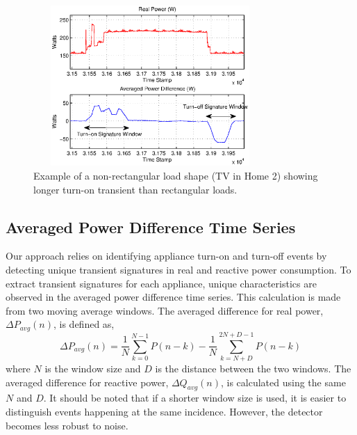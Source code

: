 \documentclass[conference]{IEEEtran}
\begin{document}
\begin{figure}[!t]
	\centering
	\includegraphics[height = 2.4in,width=3.5in]{fig/nonrec.eps}
	\caption{Example of a non-rectangular load shape (TV in Home 2) showing longer turn-on transient than rectangular loads.}
	\label{fig:nonrec}
\end{figure}


\subsection{Averaged Power Difference Time Series}
Our approach relies on identifying appliance turn-on and turn-off events by detecting unique transient signatures in real and reactive power consumption. To extract transient signatures for each appliance, unique characteristics are observed in the averaged power difference time series. This calculation is made from two moving average windows.  The averaged difference for real power, $\Delta P_{avg}(n)$, is defined as,
\begin{equation}
\Delta P_{avg}(n) = \frac{1}{N}\sum_{k=0}^{N-1}P(n-k) - \frac{1}{N}\sum_{k=N+D}^{2N+D-1}P(n-k)
\end{equation}
where $N$ is the window size and $D$ is the distance between the two windows.  The averaged difference for reactive power, $\Delta Q_{avg}(n)$, is calculated using the same $N$ and $D$.  It should be noted that if a shorter window size is used, it is easier to distinguish events happening at the same incidence.  However, the detector becomes less robust to noise.
\end{document}
